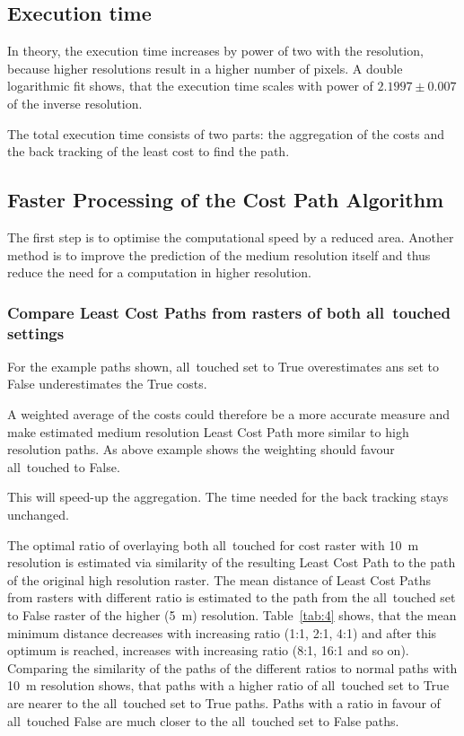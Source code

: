 \subsection{Execution time}\label{subsec:execution-time}

In theory, the execution time increases by power of two with the resolution, because higher resolutions result in a higher number of pixels. 
A double logarithmic fit shows, that the execution time scales with power of $2.1997  \pm 0.007$ of the inverse resolution. 

The total execution time consists of two parts:
the aggregation of the costs and the back tracking of the least cost to find the path.


\subsection{Faster Processing of the Cost Path Algorithm}\label{subsec:faster-processing-of-the-cost-path-algorithm}

The first step is to optimise the computational speed by a reduced area.
Another method is to improve the prediction of the medium resolution itself and thus reduce the need for a computation in higher resolution.

\subsubsection{Compare Least Cost Paths from rasters of both all~touched settings}

For the example paths shown, all~touched set to True overestimates ans set to False underestimates the True costs.

A weighted average of the costs could therefore be a more accurate measure and make estimated medium resolution Least Cost Path more similar to high resolution paths.
As above example shows the weighting should favour all~touched to False.

This will speed-up the aggregation.
The time needed for the back tracking stays unchanged.

The optimal ratio of overlaying both all~touched for cost raster with 10~m resolution is estimated via similarity of the resulting Least Cost Path to the path of the original high resolution raster. 
The mean distance of Least Cost Paths from rasters with different ratio is estimated to the path from the all~touched set to False raster of the higher (5~m) resolution. 
Table~\ref{tab:4} shows, that the mean minimum distance decreases with increasing ratio (1:1, 2:1, 4:1) and after this optimum is reached, increases with increasing ratio (8:1, 16:1 and so on).
Comparing  the similarity of the paths of the different ratios to normal paths with 10~m resolution shows, that paths with a higher ratio of all~touched set to True are nearer to the all~touched set to True paths.
Paths with a ratio in favour of all~touched False are much closer to the all~touched set to False paths.


